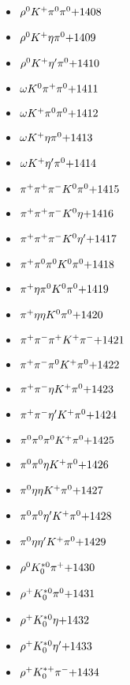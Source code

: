\begin{multicols}{3}
\begin{itemize}
 \item $ \rho^{0} K^{+} \pi^{0} \pi^{0} \hfill{+1408}$
 \item $ \rho^{0} K^{+} \eta \pi^{0} \hfill{+1409}$
 \item $ \rho^{0} K^{+} {\eta^{\prime}} \pi^{0} \hfill{+1410}$
 \item $ \omega K^{0} \pi^{+} \pi^{0} \hfill{+1411}$
 \item $ \omega K^{+} \pi^{0} \pi^{0} \hfill{+1412}$
 \item $ \omega K^{+} \eta \pi^{0} \hfill{+1413}$
 \item $ \omega K^{+} {\eta^{\prime}} \pi^{0} \hfill{+1414}$
 \item $ \pi^{+} \pi^{+} \pi^{-} K^{0} \pi^{0} \hfill{+1415}$
 \item $ \pi^{+} \pi^{+} \pi^{-} K^{0} \eta \hfill{+1416}$
 \item $ \pi^{+} \pi^{+} \pi^{-} K^{0} {\eta^{\prime}} \hfill{+1417}$
 \item $ \pi^{+} \pi^{0} \pi^{0} K^{0} \pi^{0} \hfill{+1418}$
 \item $ \pi^{+} \eta \pi^{0} K^{0} \pi^{0} \hfill{+1419}$
 \item $ \pi^{+} \eta \eta K^{0} \pi^{0} \hfill{+1420}$
 \item $ \pi^{+} \pi^{-} \pi^{+} K^{+} \pi^{-} \hfill{+1421}$
 \item $ \pi^{+} \pi^{-} \pi^{0} K^{+} \pi^{0} \hfill{+1422}$
 \item $ \pi^{+} \pi^{-} \eta K^{+} \pi^{0} \hfill{+1423}$
 \item $ \pi^{+} \pi^{-} {\eta^{\prime}} K^{+} \pi^{0} \hfill{+1424}$
 \item $ \pi^{0} \pi^{0} \pi^{0} K^{+} \pi^{0} \hfill{+1425}$
 \item $ \pi^{0} \pi^{0} \eta K^{+} \pi^{0} \hfill{+1426}$
 \item $ \pi^{0} \eta \eta K^{+} \pi^{0} \hfill{+1427}$
 \item $ \pi^{0} \pi^{0} {\eta^{\prime}} K^{+} \pi^{0} \hfill{+1428}$
 \item $ \pi^{0} \eta {\eta^{\prime}} K^{+} \pi^{0} \hfill{+1429}$
 \item $ \rho^{0} K_{0}^{*0} \pi^{+} \hfill{+1430}$
 \item $ \rho^{+} K_{0}^{*0} \pi^{0} \hfill{+1431}$
 \item $ \rho^{+} K_{0}^{*0} \eta \hfill{+1432}$
 \item $ \rho^{+} K_{0}^{*0} {\eta^{\prime}} \hfill{+1433}$
 \item $ \rho^{+} K_{0}^{*+} \pi^{-} \hfill{+1434}$

\end{itemize}
\end{multicols}
